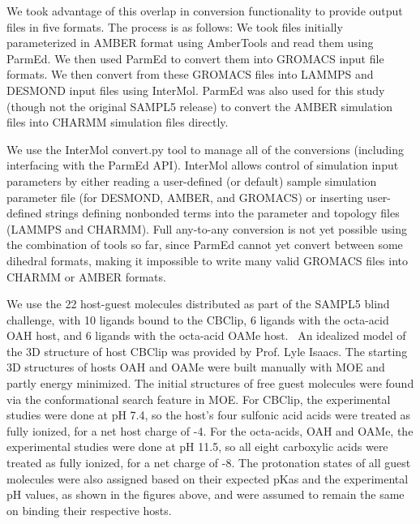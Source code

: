 We took advantage of this overlap in conversion functionality to
provide output files in five formats. The process is as follows: We
took files initially parameterized in AMBER format using AmberTools
and read them using ParmEd. We then used ParmEd to convert them into
GROMACS input file formats. We then convert from these GROMACS files
into LAMMPS and DESMOND input files using InterMol.  ParmEd was also
used for this study (though not the original SAMPL5 release) to
convert the AMBER simulation files into CHARMM simulation files
directly.

We use the InterMol convert.py tool to manage all of the conversions
(including interfacing with the ParmEd API). InterMol allows control
of simulation input parameters by either reading a user-defined (or
default) sample simulation parameter file (for DESMOND, AMBER, and
GROMACS) or inserting user-defined strings defining nonbonded terms
into the parameter and topology files (LAMMPS and CHARMM). Full
any-to-any conversion is not yet possible using the combination of
tools so far, since ParmEd cannot yet convert between some dihedral
formats, making it impossible to write many valid GROMACS files into
CHARMM or AMBER formats.

We use the 22 host-guest molecules distributed as part of the SAMPL5
blind challenge, with 10 ligands bound to the CBClip, 6 ligands with
the octa-acid OAH host, and 6 ligands with the octa-acid OAMe
host.~\cite{mainSAMPL5paper} An idealized model of the 3D structure
of host CBClip was provided by Prof. Lyle Isaacs. The starting 3D
structures of hosts OAH and OAMe were built manually with MOE and
partly energy minimized. The initial structures of free guest
molecules were found via the conformational search feature in MOE. For
CBClip, the experimental studies were done at pH 7.4, so the host’s
four sulfonic acid acids were treated as fully ionized, for a net host
charge of -4.  For the octa-acids, OAH and OAMe, the experimental
studies were done at pH 11.5, so all eight carboxylic acids were
treated as fully ionized, for a net charge of -8. The protonation
states of all guest molecules were also assigned based on their
expected pKas and the experimental pH values, as shown in the figures
above, and were assumed to remain the same on binding their respective
hosts.

